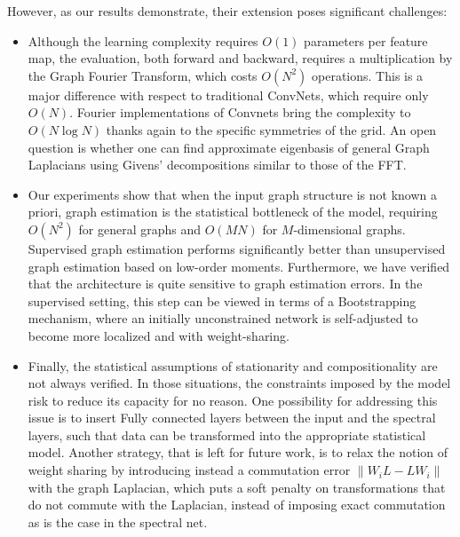 \documentclass{article} %
\begin{document}
However, as our results demonstrate, 
their extension poses significant challenges:
\begin{itemize}
\item Although the learning complexity requires $O(1)$ parameters per feature map, 
the evaluation, both forward and backward, requires a multiplication by the Graph Fourier Transform, 
which costs $O(N^2)$ operations. This is a major difference with respect to traditional ConvNets, which 
require only $O(N)$. Fourier implementations of Convnets \cite{mathieu2013fast, DBLP:journals/corr/VasilacheJMCPL14} bring the complexity to $O(N \log N)$ 
thanks again to the specific symmetries of the grid. An open question is whether one can find approximate eigenbasis
of general Graph Laplacians using Givens' decompositions similar to those of the FFT. 

\item Our experiments show that when the input graph structure is not known a priori, graph estimation is
the statistical bottleneck of the model, requiring $O(N^2)$ for general graphs and $O(M N)$ for $M$-dimensional graphs.
Supervised graph estimation performs significantly better than unsupervised graph estimation based on low-order moments. Furthermore, we have verified that
the architecture is quite sensitive to graph estimation errors. In the supervised setting, this step can be viewed in terms of
a Bootstrapping mechanism, where an initially unconstrained network is self-adjusted to become more localized and with weight-sharing. 

\item Finally, the statistical assumptions of stationarity and compositionality are not always verified. In those situations, the constraints
imposed by the model risk to reduce its capacity for no reason. One possibility for addressing this issue is to insert Fully connected 
layers between the input and the spectral layers, such that data can be transformed into the appropriate statistical model. Another strategy, that is
left for future work, is to relax the notion of weight sharing by introducing instead a commutation error $\| W_i L - L W_i \|$ with the graph Laplacian, 
which puts a soft penalty on transformations that do not commute with the Laplacian, instead of imposing exact commutation as is the case in the spectral net. 

\end{itemize}

\pagebreak

{}

\end{document}
